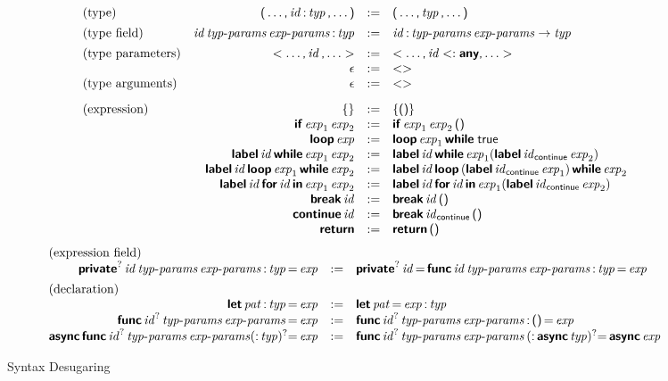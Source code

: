 \begin{figure*}

$$
\begin{array}{lrcl}
\text{(type)} &
\K( \dots \K, \x{id} \K: \x{typ} \K, \dots \K) &:=&
  \K( \dots \K, \x{typ} \K, \dots \K) \\
[1ex]
\text{(type field)} &
\x{id} \x{typ-params} \x{exp-params} \K: \x{typ} &:=&
  \x{id} \K: \x{typ-params} \x{exp-params} \Kto \x{typ} \\
[1ex]
\text{(type parameters)} &
\Klt \dots \K, \x{id} \K, \dots \Kgt &:=&
  \Klt \dots \K, \x{id} \Ksub \KK{any} \K, \dots \Kgt \\&
\epsilon &:=&
  \Klt \Kgt \\
\text{(type arguments)} &
\epsilon &:=&
  \Klt \Kgt \\
[2ex]
\text{(expression)} &
\K\{ \K\} &:=&
  \K\{ \K{()} \K\} \\&
\KK{if} \x{exp}_1 \x{exp}_2 &:=&
  \KK{if} \x{exp}_1 \x{exp}_2 \K{()} \\&
\KK{loop} \x{exp} &:=&
  \KK{loop} \x{exp}_1 \KK{while} \; \K{true} \\&
\KK{label} \x{id} \KK{while} \x{exp}_1 \x{exp}_2 &:=&
  \KK{label} \x{id} \KK{while} \x{exp}_1 (\KK{label} \x{id}_{\K{continue}} \x{exp}_2) \\&
\KK{label} \x{id} \KK{loop} \x{exp}_1 \KK{while} \x{exp}_2 &:=&
  \KK{label} \x{id} \KK{loop} \, (\KK{label} \x{id}_{\K{continue}} \x{exp}_1) \, \KK{while} \x{exp}_2 \\&
\KK{label} \x{id} \KK{for} \x{id} \KK{in} \x{exp}_1 \x{exp}_2 &:=&
  \KK{label} \x{id} \KK{for} \x{id} \KK{in} \x{exp}_1 (\KK{label} \x{id}_{\K{continue}} \x{exp}_2) \\&
\KK{break} \x{id} &:=&
  \KK{break} \x{id} \K{()} \\&
\KK{continue} \x{id} &:=&
  \KK{break} \x{id}_{\K{continue}} \K{()} \\&
\KK{return} &:=&
  \KK{return} \, \K{()} \\
\end{array}
$$
$$
\begin{array}{rcl}
\text{(expression field)} \hfill \\
\KK{private}^? \x{id} \x{typ-params} \x{exp-params} \K: \x{typ} \K= \x{exp} &:=&
  \KK{private}^? \x{id} \K= \, \KK{func} \x{id} \x{typ-params} \x{exp-params} \K: \x{typ} \K= \x{exp} \\
[1ex]
\text{(declaration)} \hfill \\
\KK{let} \x{pat} \K: \x{typ} \K= \x{exp} &:=&
  \KK{let} \x{pat} \K= \x{exp} \K: \x{typ} \\
\KK{func} \x{id}^? \x{typ-params} \x{exp-params} \K= \x{exp} &:=&
  \KK{func} \x{id}^? \x{typ-params} \x{exp-params} \K: \, \K{()} \, \K= \x{exp} \\
\KK{async} \, \KK{func} \x{id}^? \x{typ-params} \x{exp-params} (\K: \x{typ})^? \K= \x{exp} &:=&
\KK{func} \x{id}^? \x{typ-params} \x{exp-params} \, (\K: \, \KK{async} \x{typ})^? \K= \, \KK{async} \x{exp} \\
\end{array}
$$

\caption{Syntax Desugaring}
\label{fig:syntax.sugar}

\end{figure*}
